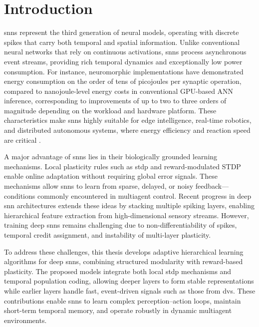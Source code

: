 \chapter{Introduction}

\ac{snn}s represent the third generation of neural models, operating with discrete spikes that carry both temporal and spatial information. Unlike conventional neural networks that rely on continuous activations, \ac{snn}s process asynchronous event streams, providing rich temporal dynamics and exceptionally low power consumption. For instance, neuromorphic implementations have demonstrated energy consumption on the order of tens of picojoules per synaptic operation, compared to nanojoule-level energy costs in conventional GPU-based ANN inference, corresponding to improvements of up to two to three orders of magnitude depending on the workload and hardware platform. These characteristics make \ac{snn}s highly suitable for edge intelligence, real-time robotics, and distributed autonomous systems, where energy efficiency and reaction speed are critical \cite{Ch_1_R2, Ch_1_R3}.


A major advantage of \ac{snn}s lies in their biologically grounded learning mechanisms. Local plasticity rules such as \ac{stdp} and reward-modulated STDP enable online adaptation without requiring global error signals. These mechanisms allow \ac{snn}s to learn from sparse, delayed, or noisy feedback—conditions commonly encountered in multiagent control. Recent progress in deep \ac{snn} architectures extends these ideas by stacking multiple spiking layers, enabling hierarchical feature extraction from high-dimensional sensory streams. However, training deep \ac{snn}s remains challenging due to non-differentiability of spikes, temporal credit assignment, and instability of multi-layer plasticity.

To address these challenges, this thesis develops adaptive hierarchical learning algorithms for deep \ac{snn}s, combining structured modularity with reward-based plasticity. The proposed models integrate both local \ac{stdp} mechanisms and temporal population coding, allowing deeper layers to form stable representations while earlier layers handle fast, event-driven signals such as those from \ac{dvs}. These contributions enable \ac{snn}s to learn complex perception–action loops, maintain short-term temporal memory, and operate robustly in dynamic multiagent environments.

